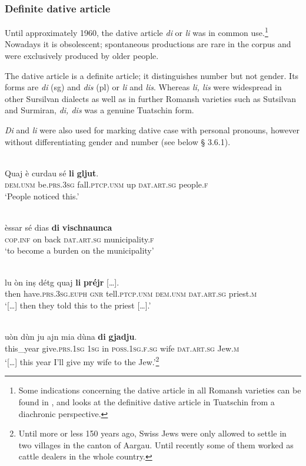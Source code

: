 \subsubsection{Definite dative article} 
Until approximately 1960, the dative article \textit{di} or \textit{li} was in common use.\footnote{Some indications concerning the dative article in all Romansh varieties can be found in \citet{Linder1987}, and \citet{Maurer2017} looks at the definitive dative article in Tuatschin from a diachronic perspective.} Nowadays it is obsolescent; spontaneous productions are rare in the corpus and were exclusively produced by older people.

The dative article is a definite article; it distinguishes number but not gender. Its forms are \textit{di} (sg) and \textit{dis} (pl) or \textit{li} and \textit{lis}.  Whereas \textit{li, lis} were widespread in other Sursilvan dialects as well as in further  Romansh varieties such as Sutsilvan and Surmiran, \textit{di, dis} was a genuine Tuatschin form.

\textit{Di} and \textit{li} were also used for marking dative case with personal pronouns, however without differentiating gender and number (see below § 3.6.1).

\ea\label{}
 {\citealt[12]{Büchli1966}}\\
\gll  Quaj è curdau sé \textbf{li} \textbf{gljut}.\\
     \textsc{dem.unm} be.\textsc{prs.3sg} fall.\textsc{ptcp.unm} up \textsc{dat.art.sg} people.\textsc{f}\\
\glt `People noticed this.'
\z

\ea\label{ex:1:}
\\
\gll  èssar sé dias \textbf{di} \textbf{vischnaunca}\\
\textsc{cop.inf} on back \textsc{dat.art.sg} municipality.\textsc{f}\\
\glt `to become a burden on the municipality'
\z

\ea\label{}
\\
\gll […] lu òn inṣ détg quaj \textbf{li} \textbf{préjr} […].\\
{} then have.\textsc{prs.3sg.euph} \textsc{gnr} tell.\textsc{ptcp.unm} \textsc{dem.unm} \textsc{dat.art.sg} priest.\textsc{m}\\
\glt `[…] then they told this to the priest […].'
\z

\ea\label{}
\\
\gll […] uòn dùn ju ajn mia dùna \textbf{di} \textbf{gjadju}.\\
{} this\_year give.\textsc{prs.1sg} \textsc{1sg} in \textsc{poss.1sg.f.sg} wife \textsc{dat.art.sg} Jew.\textsc{m} \\
\glt `[…] this year I’ll give my wife to the Jew.'\footnote{Until more or less 150 years ago, Swiss Jews were only allowed to settle in two villages in the canton of Aargau. Until recently some of them worked as cattle dealers in the whole country.}
\z

